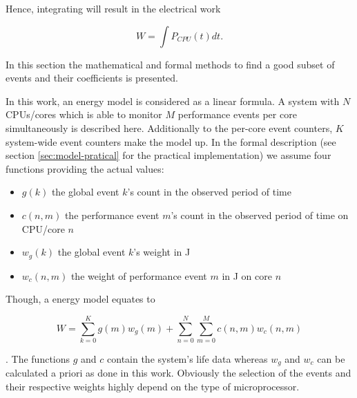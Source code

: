 Hence, integrating will result in the electrical work

\begin{equation}
  W = \int P_{CPU}(t)dt.
\end{equation}


\label{sec:model}

In this section the mathematical and formal methods to find a good subset of
events and their coefficients is presented.

\label{sec:model-properties}

In this work, an energy model is considered as a linear formula. A system with
$N$ CPUs/cores which is able to monitor $M$ performance events per core
simultaneously is described here. Additionally to the per-core event counters,
$K$ system-wide event counters make the model up. In the formal description (see
section \ref{sec:model-pratical} for the practical implementation) we assume
four functions providing the actual values:

\begin{itemize}

\item $g(k)$ the global event $k$'s count in the observed period of time

\item $c(n, m)$ the performance event $m$'s count in the observed period of time
      on CPU/core $n$

\item $w_g(k)$ the global event $k$'s weight in \si{\joule}

\item $w_c(n, m)$ the weight of performance event $m$ in \si{\joule} on core
$n$

\end{itemize}

Though, a energy model equates to

\begin{equation}
W = \sum\limits_{k=0}^K g(m) w_g(m) +
\sum\limits_{n=0}^N \sum\limits_{m=0}^M c(n, m) w_c(n,m)
\end{equation}

. The functions $g$ and $c$ contain the system's life data whereas $w_g$ and
$w_c$ can be calculated a priori as done in this work. Obviously the selection
of the events and their respective weights highly depend on the type of
microprocessor.


